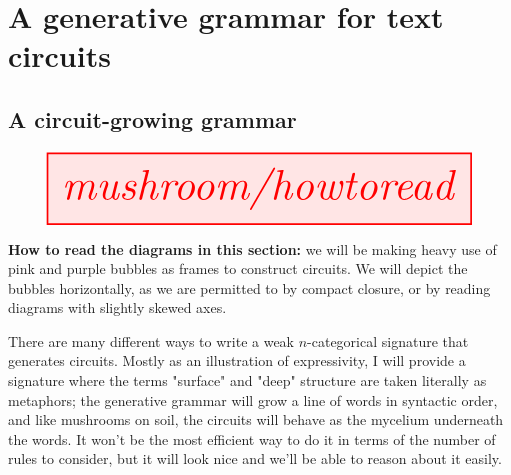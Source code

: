 \newpage

\section{A generative grammar for text circuits}

\subsection{A circuit-growing grammar}



\begin{marginfigure}
\centering
\[
\resizebox{\textwidth}{!}{\tikzfig{mushroom/howtoread}}
\]
\caption{\textbf{How to read the diagrams in this section:} we will be making heavy use of pink and purple bubbles as frames to construct circuits. We will depict the bubbles horizontally, as we are permitted to by compact closure, or by reading diagrams with slightly skewed axes.}
\end{marginfigure}

There are many different ways to write a weak $n$-categorical signature that generates circuits. Mostly as an illustration of expressivity, I will provide a signature where the terms "surface" and "deep" structure are taken literally as metaphors; the generative grammar will grow a line of words in syntactic order, and like mushrooms on soil, the circuits will behave as the mycelium underneath the words. It won't be the most efficient way to do it in terms of the number of rules to consider, but it will look nice and we'll be able to reason about it easily.\\

